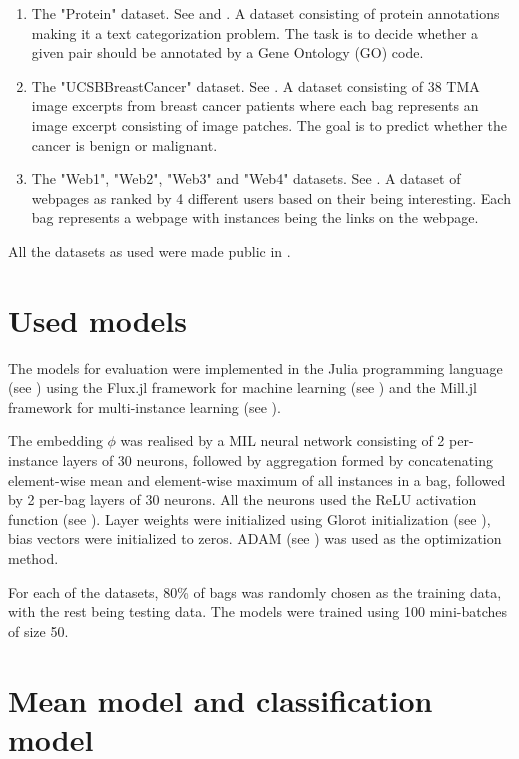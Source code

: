 \begin{enumerate}
  \item The "Protein" dataset. See \cite{ray_learning_2005} and \cite{ray_supervised_2005}. A dataset consisting of protein annotations making it a text categorization problem. The task is to decide whether a given pair should be annotated by a Gene Ontology (GO) code.
  \item The "UCSBBreastCancer" dataset. See \cite{kandemir_empowering_2014}. A dataset consisting of 38 TMA image excerpts from breast cancer patients where each bag represents an image excerpt consisting of image patches. The goal is to predict whether the cancer is benign or malignant.
  \item The "Web1", "Web2", "Web3" and "Web4" datasets. See \cite{zhou_multi-instance_2005}. A dataset of webpages as ranked by 4 different users based on their being interesting. Each bag represents a webpage with instances being the links on the webpage.
\end{enumerate}

All the datasets as used were made public in \cite{dedic_mildatasetsjl_2019}.

\section{Used models}

The models for evaluation were implemented in the Julia programming language (see \cite{bezanson_julia:_2017}) using the Flux.jl framework for machine learning (see \cite{innes_flux:_2018}) and the Mill.jl framework for multi-instance learning (see \cite{pevny_milljl_2019}).

The embedding \( \phi \) was realised by a MIL neural network consisting of 2 per-instance layers of 30 neurons, followed by aggregation formed by concatenating element-wise mean and element-wise maximum of all instances in a bag, followed by 2 per-bag layers of 30 neurons. All the neurons used the ReLU activation function (see \cite{hahnloser_digital_2000}). Layer weights were initialized using Glorot initialization (see \cite{glorot_understanding_2010}), bias vectors were initialized to zeros. ADAM (see \cite{kingma_adam:_2014}) was used as the optimization method.

For each of the datasets, 80\% of bags was randomly chosen as the training data, with the rest being testing data. The models were trained using 100 mini-batches of size 50.

\section{Mean model and classification model}

